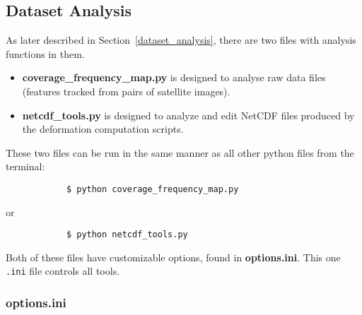 \documentclass{article}
\begin{document}
    \subsection{Dataset Analysis}

        As later described in Section~\ref{dataset_analysis}, there are two files with analysis functions in them.
        \begin{itemize}
            \item \textbf{coverage\_frequency\_map.py} is designed to analyse raw data files (features tracked from pairs of satellite images).
            \item \textbf{netcdf\_tools.py} is designed to analyze and edit NetCDF files produced by the deformation computation scripts.
        \end{itemize}

        These two files can be run in the same manner as all other python files from the terminal:
        \begin{verbatim}
            $ python coverage_frequency_map.py
        \end{verbatim}
        or
        \begin{verbatim}
            $ python netcdf_tools.py
        \end{verbatim}
        Both of these files have customizable options, found in \textbf{options.ini}. This one \verb?.ini? file controls all tools.

        \subsubsection{\textbf{options.ini}}
\end{document}
